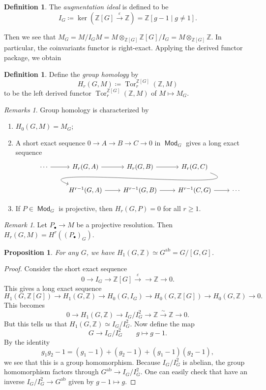 \documentclass[leqno, openany]{memoir}
\newtheorem{prop}[thm]{Proposition}
\theoremstyle{definition}
\newtheorem{defn}[thm]{Definition}
\theoremstyle{remark}
\newtheorem{rmk}[thm]{Remark}
\newtheorem{rmks}[thm]{Remarks}
\theoremstyle{plain}
\theoremstyle{definition}
\theoremstyle{remark}
\newcommand{\Z}{\mathbb{Z}}
\newcommand{\ep}{\varepsilon}
\newcommand{\mr}[1]{\mathrm{#1}}
\DeclareMathOperator{\Tor}{Tor}
\DeclareMathOperator{\Mod}{\mathsf{Mod}}
\begin{document}
\begin{defn} The \textit{augmentation ideal} is defined to be \[ I_G \coloneqq
\ker (\Z[G] \xrightarrow{\ep} \Z) = \Z[g-1 \mid g \neq 1]. \] \end{defn}

Then we see that $M_G = M/I_G M = M \otimes_{\Z[G]} \Z[G]/I_G = M
\otimes_{\Z[G]} \Z$. In particular, the coinvariants functor is right-exact.
Applying the derived functor package, we obtain

\begin{defn} Define the \textit{group homology} by \[ H_r(G, M) \coloneqq
\Tor_r^{\Z[G]} (\Z, M) \] to be the left derived functor $\Tor_r^{\Z[G]}(\Z,
M)$ of $M \mapsto M_G$.  \end{defn}

\begin{rmks} Group homology is characterized by \begin{enumerate} \item $H_0(G,
    M) = M_G$; \item A short exact sequence $0 \to A \to B \to C \to 0$ in
    $\Mod_G$ gives a long exact sequence \begin{equation*} \begin{tikzcd}
        \cdots \arrow{r} & H_r(G, A) \ar{r} & H_r(G, B) \ar{r} & H_r(G, C)
        \ar[out=-20,in=160]{dll} \\ & H^{r-1}(G,A) \ar{r} & H^{r-1}(G,B) \ar{r}
                                    & H^{r-1}(C,G) \ar{r} & \cdots \end{tikzcd}
                            \end{equation*} \item If $P \in \Mod_G$ is
                    projective, then $H_r(G, P) = 0$ for all $r \geq 1$.
            \end{enumerate} \end{rmks}

\begin{rmk} Let $P_{\bullet} \to M$ be a projective resolution. Then $H_r(G, M)
= H^r({(P_{\bullet})}_G)$.  \end{rmk}

\begin{prop} For any $G$, we have $H_1(G, \Z) \simeq G^{\mr{ab}} = G/[G,G]$.
\end{prop}

\begin{proof} Consider the short exact sequence \[ 0 \to I_G \to \Z[G]
    \xrightarrow{\ep} \to \Z \to 0. \] This gives a long exact sequence \[
H_1(G, \Z[G]) \to H_1(G, \Z) \to H_0(G, I_G) \to H_0(G, \Z[G]) \to H_0(G, \Z)
\to 0. \] This becomes \[ 0 \to H_1(G, \Z) \to I_G / I_G^2 \to \Z
\xrightarrow{\sim} \Z \to 0. \] But this tells us that $H_1(G, \Z) \simeq I_G /
I_G^2$. Now define the map \[ G \to I_G / I_G^2 \qquad g \mapsto g-1. \] By the
identity \[ g_1 g_2 - 1 = (g_1 - 1) + (g_2 - 1) + (g_1 - 1)(g_2 - 1), \] we see
that this is a group homomorphism. Because $I_G/I_G^2$ is abelian, the group
homomorphism factors through $G^{\mr{ab}} \to I_G / I_G^2$. One can easily
check that have an inverse $I_G / I_G^2 \to G^{\mr{ab}}$ given by $g-1 \mapsto
g$.  \end{proof}
\end{document}
